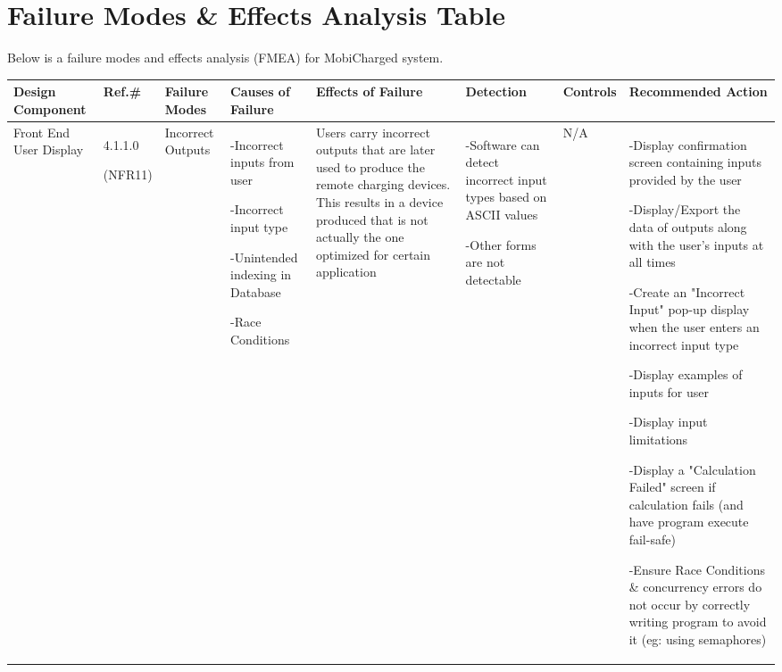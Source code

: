 \documentclass[12pt, titlepage]{article}
\begin{document}
\section{Failure Modes \& Effects Analysis Table}
Below is a failure modes and effects analysis (FMEA) for MobiCharged system.
\newpage
\fancyhf{}
\fancyhead[C]{\thepage}
\renewcommand{\headrulewidth}{0pt}
\pagestyle{fancy}
\begin{center}
\begin{adjustwidth}{-3.5cm}{}
\begin{tabular}{|p{1.5cm}|p{1.4cm}|p{1.5cm}|p{2cm}|p{3.5cm}|p{2cm}|p{1.4cm}|p{4.3cm}|}
\hline
Design Component & Ref.\# & Failure Modes & Causes of Failure & Effects of Failure & Detection & Controls & Recommended Action\\
\hline
Front End User Display & 4.1.1.0 \par(NFR11) & Incorrect Outputs & -Incorrect inputs from user \par -Incorrect input type \par -Unintended indexing in Database \par -Race Conditions & Users carry incorrect outputs that are later used to produce the remote charging devices. This results in a device produced that is not actually the one optimized for certain application & -Software can detect incorrect input types based on ASCII values \par -Other forms are not detectable & N/A & -Display confirmation screen containing inputs provided by the user \par -Display/Export the data of outputs along with the user's inputs at all times \par -Create an "Incorrect Input" pop-up display when the user enters an incorrect input type \par -Display examples of inputs for user \par -Display input limitations \par -Display a "Calculation Failed" screen if calculation fails (and have program execute fail-safe) \par -Ensure Race Conditions \& concurrency errors do not occur by correctly writing program to avoid it (eg: using semaphores) \par\\


\end{tabular}
\end{adjustwidth}
\end{center}
\end{document}
